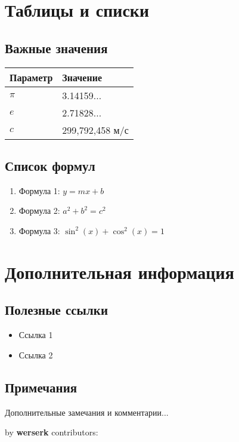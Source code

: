 \documentclass[10pt,landscape,a4paper]{article}
\begin{document}
\begin{multicols}{2}
\section{Таблицы и списки}

\subsection{Важные значения}
\begin{center}
\begin{tabular}{@{}ll@{}}
\toprule
Параметр & Значение \\
\midrule
$\pi$ & 3.14159... \\
$e$ & 2.71828... \\
$c$ & 299,792,458 м/с \\
\bottomrule
\end{tabular}
\end{center}

\subsection{Список формул}
\begin{enumerate}
    \item Формула 1: $y = mx + b$
    \item Формула 2: $a^2 + b^2 = c^2$
    \item Формула 3: $\sin^2(x) + \cos^2(x) = 1$
\end{enumerate}

\section{Дополнительная информация}

\subsection{Полезные ссылки}
\begin{itemize}
    \item Ссылка 1
    \item Ссылка 2
\end{itemize}

\subsection{Примечания}
Дополнительные замечания и комментарии...

\end{multicols}

{\noindent\color{accent}\tiny by \textbf{werserk} \hfill contributors: \texttt{\contributors}}
\end{document}
